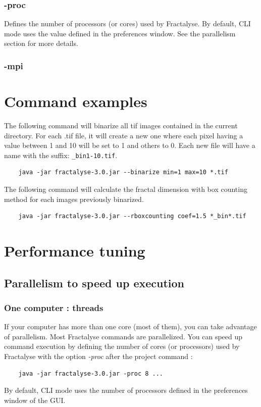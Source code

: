 \documentclass[a4paper,10pt]{report}
\begin{document}
\subsection{-proc}
Defines the number of processors (or cores) used by Fractalyse.
By default, CLI mode uses the value defined in the preferences window.
See the parallelism section for more details.

\subsection{-mpi}

\chapter{Command examples}
The following command will binarize all tif images contained in the current directory. For each .tif file, it will create a new one where each pixel having a value between 1 and 10 will be set to 1 and others to 0. Each new file will have a name with the suffix: \verb|_bin1-10.tif|.
\begin{Verbatim}
	java -jar fractalyse-3.0.jar --binarize min=1 max=10 *.tif
\end{Verbatim}

The following command will calculate the fractal dimension with box counting method for each images previously binarized.
\begin{Verbatim}
	java -jar fractalyse-3.0.jar --rboxcounting coef=1.5 *_bin*.tif
\end{Verbatim}

\chapter{Performance tuning}
\section{Parallelism to speed up execution}
\subsection{One computer : threads}
If your computer has more than one core (most of them), you can take advantage of parallelism. 
Most Fractalyse commands are parallelized. You can speed up command execution by defining the number
of cores (or processors) used by Fractalyse with the option \textit{-proc} after the project command :
\begin{Verbatim}
	java -jar fractalyse-3.0.jar -proc 8 ...
\end{Verbatim}
By default, CLI mode uses the number of processors defined in the preferences window of the GUI.
\end{document}
